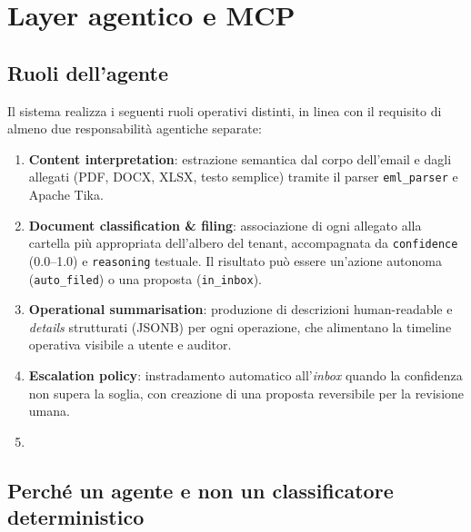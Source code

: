 \chapter{Layer agentico e MCP}
\label{chap:agentico}

\section{Ruoli dell'agente}
\label{sec:ruoli_agente}

Il sistema realizza i seguenti ruoli operativi distinti, in linea con il requisito
di almeno due responsabilit\`a agentiche separate:

\begin{enumerate}[leftmargin=*]
    \item \textbf{Content interpretation}: estrazione semantica dal corpo dell'email e
          dagli allegati (PDF, DOCX, XLSX, testo semplice) tramite il parser
          \texttt{eml\_parser} e Apache Tika.

    \item \textbf{Document classification \& filing}: associazione di ogni allegato alla
          cartella pi\`u appropriata dell'albero del tenant, accompagnata da
          \texttt{confidence} (0.0--1.0) e \texttt{reasoning} testuale. Il risultato
          pu\`o essere un'azione autonoma (\texttt{auto\_filed}) o una proposta
          (\texttt{in\_inbox}).

    \item \textbf{Operational summarisation}: produzione di descrizioni human-readable
          e \emph{details} strutturati (JSONB) per ogni operazione, che alimentano
          la timeline operativa visibile a utente e auditor.

    \item \textbf{Escalation policy}: instradamento automatico all'\emph{inbox}
          quando la confidenza non supera la soglia, con creazione di una proposta
          reversibile per la revisione umana.

    \item {}
\end{enumerate}

\section{Perch\'e un agente e non un classificatore deterministico}
\label{sec:perche_agente}


